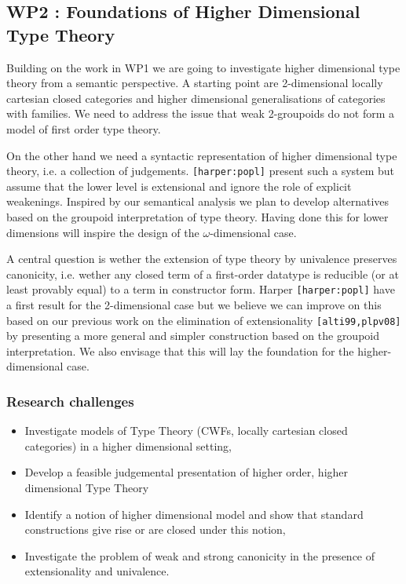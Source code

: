 \documentclass[twocolumn,a4paper]{article}
\renewcommand{\cite}[1]{{\tt[#1]}}
\begin{document}
\subsection*{WP2 : Foundations of Higher Dimensional Type Theory}

Building on the work in WP1 we are going to investigate higher
dimensional type theory from a semantic perspective. A starting point
are 2-dimensional locally cartesian closed categories and
higher dimensional generalisations of categories with families. We
need to address the issue that weak 2-groupoids do not form a model of
first order type theory. 

On the other hand we need a syntactic representation of higher
dimensional type theory, i.e. a collection of
judgements. \cite{harper:popl} present such a system but assume that
the lower level is extensional and ignore the role of explicit
weakenings. Inspired by our semantical analysis we plan to develop
alternatives based on the groupoid interpretation of type theory.
Having done this for lower dimensions will inspire the design of
the $\omega$-dimensional case.

A central question is wether the extension of type theory by
univalence preserves canonicity, i.e. wether any closed term of a
first-order datatype is reducible (or at least provably equal) to a
term in constructor form. Harper \cite{harper:popl} have a first
result for the 2-dimensional case but we believe we can improve on
this based on our previous work on the elimination of extensionality
\cite{alti99,plpv08} by presenting a more general and simpler
construction based on the groupoid interpretation. We also envisage
that this will lay the foundation for the higher-dimensional case.

\subsubsection*{Research challenges}
\label{sec:rsearch-challenges}

\begin{itemize}
\item Investigate models of Type Theory (CWFs, locally cartesian
  closed categories) in a higher dimensional setting,

\item Develop a feasible judgemental presentation of higher order,
  higher dimensional Type Theory

\item Identify a notion of higher dimensional model and show that
  standard constructions give rise or are closed under this notion,

\item Investigate the problem of weak and strong canonicity
  in the presence of extensionality and univalence.
\end{itemize}
\end{document}
